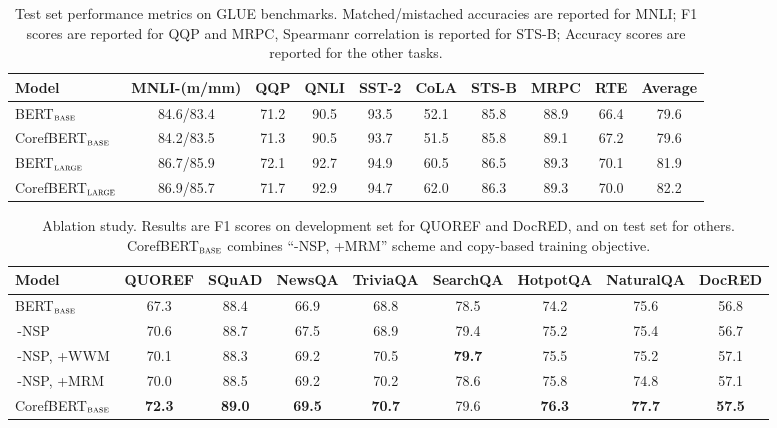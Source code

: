 \documentclass[11pt,a4paper]{article}
\newcommand\BASESIZE{$_{\small \textsc{base}}$\xspace}
\newcommand\LARGESIZE{$_{\small \textsc{large}}$\xspace}
\begin{document}
\begin{table*}[!t]
\small
\centering
\begin{tabular}{l c c c c c c c c c}
\toprule

Model &   MNLI-(m/mm)  & QQP & QNLI & SST-2 & CoLA & STS-B & MRPC & RTE & Average \\
\midrule
BERT\BASESIZE &  84.6/83.4 &71.2  & 90.5 & 93.5  & 52.1 & 85.8 &88.9 & 66.4 & 79.6\\
CorefBERT\BASESIZE &  84.2/83.5 &71.3  & 90.5 & 93.7  &51.5 & 85.8 &89.1 & 67.2 & 79.6\\
\midrule
BERT\LARGESIZE &   86.7/85.9  &72.1  & 92.7 & 94.9  & 60.5 & 86.5 &89.3 & 70.1 & 81.9\\
CorefBERT\LARGESIZE &  86.9/85.7 &71.7  & 92.9 & 94.7  & 62.0 & 86.3 & 89.3 & 70.0 & 82.2\\
\bottomrule
\end{tabular}
\caption{Test set performance metrics on GLUE benchmarks. 
Matched/mistached accuracies are reported for MNLI; F1 scores are reported for QQP and MRPC, Spearmanr correlation is reported for STS-B; Accuracy scores are reported for the other tasks.} 
\label{tab:GLUE_result}  
\end{table*}

\begin{table*}[!t]
\small
\centering
\begin{tabular}{lcccccccc}
\toprule

Model &  {QUOREF} & {SQuAD}& {NewsQA}  & {TriviaQA} & {SearchQA} &{HotpotQA} &{NaturalQA}  & {DocRED} \\
\midrule
BERT\BASESIZE & 67.3 & 88.4& 66.9 &68.8  & 78.5  & 74.2  & 75.6 & 56.8 \\
\,-NSP  &70.6  & 88.7 & 67.5 & 68.9 & 79.4  & 75.2 & 75.4 & 56.7 \\
\,-NSP, +WWM  & 70.1 &88.3 & 69.2 & 70.5&  \bf{79.7}& 75.5 & 75.2 & 57.1 \\
\,-NSP, +MRM  & 70.0 & 88.5 & 69.2&  70.2& 78.6 &75.8 & 74.8 & 57.1\\
CorefBERT\BASESIZE  & \bf{72.3} &  \bf{89.0} & \bf{69.5} & \bf{70.7} & 79.6 & \bf{76.3} & \bf{77.7} & \bf{57.5}\\ 



\bottomrule
\end{tabular}
\caption{Ablation study. Results are F1 scores on development set for QUOREF and DocRED, and on test set for others. CorefBERT\BASESIZE combines ``-NSP, +MRM'' scheme and copy-based training objective. } 
\label{tab:Abalation_result}
\end{table*}
\end{document}

